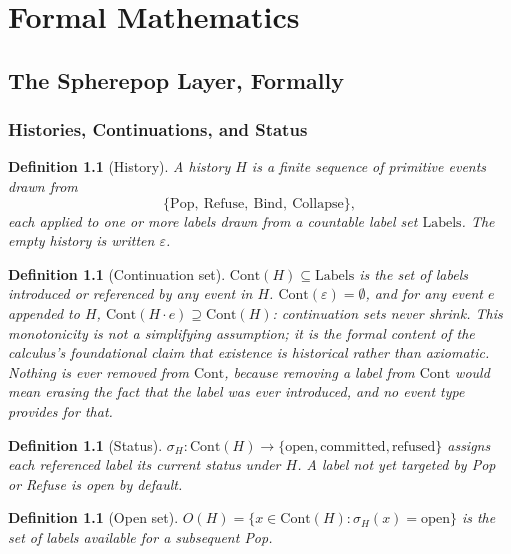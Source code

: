 \documentclass[11pt,twoside]{book}
\newtheorem{definition}[theorem]{Definition}
\begin{document}
\part{Formal Mathematics}

\chapter{The Spherepop Layer, Formally}

\section{Histories, Continuations, and Status}

\begin{definition}[History]
A history $H$ is a finite sequence of primitive events drawn from
\[
\{\mathrm{Pop}, \ \mathrm{Refuse}, \ \mathrm{Bind}, \ \mathrm{Collapse}\},
\]
each applied to one or more labels drawn from a countable label set $\mathrm{Labels}$. The empty history is written $\varepsilon$.
\end{definition}

\begin{definition}[Continuation set]
$\mathrm{Cont}(H) \subseteq \mathrm{Labels}$ is the set of labels introduced or referenced by any event in $H$. $\mathrm{Cont}(\varepsilon) = \emptyset$, and for any event $e$ appended to $H$, $\mathrm{Cont}(H \cdot e) \supseteq \mathrm{Cont}(H)$: continuation sets never shrink. This monotonicity is not a simplifying assumption; it is the formal content of the calculus's foundational claim that existence is historical rather than axiomatic. Nothing is ever removed from $\mathrm{Cont}$, because removing a label from $\mathrm{Cont}$ would mean erasing the fact that the label was ever introduced, and no event type provides for that.
\end{definition}

\begin{definition}[Status]
$\sigma_H : \mathrm{Cont}(H) \rightarrow \{\mathrm{open}, \mathrm{committed}, \mathrm{refused}\}$ assigns each referenced label its current status under $H$. A label not yet targeted by Pop or Refuse is open by default.
\end{definition}

\begin{definition}[Open set]
$O(H) = \{x \in \mathrm{Cont}(H) : \sigma_H(x) = \mathrm{open}\}$ is the set of labels available for a subsequent Pop.
\end{definition}
\end{document}
